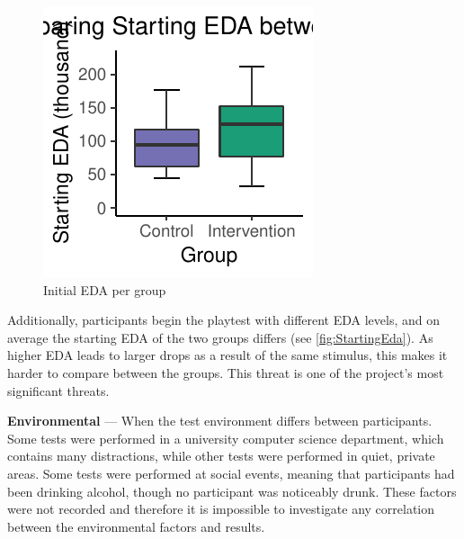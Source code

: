 \documentclass[12pt,a4paper]{article}\usepackage[]{graphicx}\usepackage[]{color}
\makeatletter
\def\maxwidth{ %
  \ifdim\Gin@nat@width>\linewidth
    \linewidth
  \else
    \Gin@nat@width
  \fi
}
\makeatother
\begin{document}
\begin{figure}
	\vspace{-25pt}


{\centering \includegraphics[width=\maxwidth]{figure/StartingEda-1} 

}



	\caption{Initial EDA per group}
	\label{fig:StartingEda}
\end{figure}

Additionally, participants begin the playtest with different EDA levels, and on average the starting EDA of the two groups differs (see \vref{fig:StartingEda}).
As higher EDA leads to larger drops as a result of the same stimulus, this makes it harder to compare between the groups.
This threat is one of the project's most significant threats.

\textbf{Environmental} --- When the test environment differs between participants.
Some tests were performed in a university computer science department, which contains many distractions, while other tests were performed in quiet, private areas.
Some tests were performed at social events, meaning that participants had been drinking alcohol, though no participant was noticeably drunk.
These factors were not recorded and therefore it is impossible to investigate any correlation between the environmental factors and results.
\end{document}
